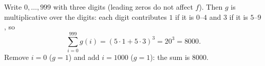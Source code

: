 Write $0,\dots,999$ with three digits (leading zeros do not affect $f$). Then $g$ is multiplicative over the digits: each digit contributes $1$ if it is $0$--$4$ and $3$ if it is $5$--$9$, so
\[\sum_{i=0}^{999}g(i)=(5\cdot1+5\cdot3)^3=20^3=8000.\]
Remove $i=0$ ($g=1$) and add $i=1000$ ($g=1$): the sum is $\boxed{8000}$.
